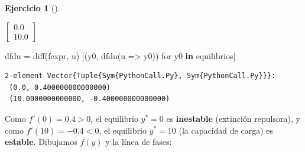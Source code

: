 \documentclass[
  spanish,
  a4paper,
]{scrreport}
\newenvironment{Shaded}{\begin{snugshade}}{\end{snugshade}}
\newcommand{\FunctionTok}[1]{\textcolor[rgb]{0.28,0.35,0.67}{#1}}
\newcommand{\KeywordTok}[1]{\textcolor[rgb]{0.00,0.23,0.31}{\textbf{#1}}}
\newcommand{\NormalTok}[1]{\textcolor[rgb]{0.00,0.23,0.31}{#1}}
\newcommand{\OperatorTok}[1]{\textcolor[rgb]{0.37,0.37,0.37}{#1}}
\theoremstyle{definition}
\newtheorem{exercise}{Ejercicio}[chapter]
\theoremstyle{remark}
\begin{document}
\begin{exercise}[]
\begin{enumerate}
\begin{tcolorbox}
  $\left[\begin{smallmatrix}0.0\\10.0\end{smallmatrix}\right]$

\begin{Shaded}
\begin{Highlighting}[]
\NormalTok{dfdu }\OperatorTok{=} \FunctionTok{diff}\NormalTok{(fexpr, u)}
\NormalTok{[(y0, }\FunctionTok{dfdu}\NormalTok{(u }\OperatorTok{=\textgreater{}}\NormalTok{ y0)) for y0 }\KeywordTok{in}\NormalTok{ equilibrios]}
\end{Highlighting}
\end{Shaded}

\begin{verbatim}
2-element Vector{Tuple{Sym{PythonCall.Py}, Sym{PythonCall.Py}}}:
 (0.0, 0.400000000000000)
 (10.0000000000000, -0.400000000000000)
\end{verbatim}

  Como \(f'(0)=0.4>0\), el equilibrio \(y^*=0\) es \textbf{inestable}
  (extinción repulsora), y como \(f'(10)=-0.4<0\), el equilibrio
  \(y^*=10\) (la capacidad de carga) es \textbf{estable}. Dibujamos
  \(f(y)\) y la línea de fases:


\end{tcolorbox}
\end{enumerate}
\end{exercise}
\end{document}
